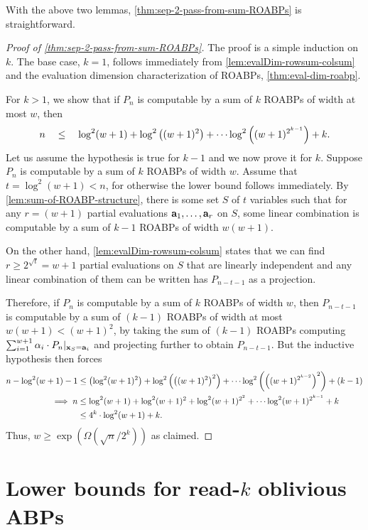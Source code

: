 \documentclass[11pt]{article}
\begin{document}
With the above two lemmas, \autoref{thm:sep-2-pass-from-sum-ROABPs} is straightforward. 

\begin{proof}[Proof of \autoref{thm:sep-2-pass-from-sum-ROABPs}]
  The proof is a simple induction on $k$. The base case, $k=1$, follows immediately from \autoref{lem:evalDim-rowsum-colsum} and the evaluation dimension characterization of ROABPs, \autoref{thm:eval-dim-roabp}.

  For $k>1$, we show that if $P_n$ is computable by a sum of $k$ ROABPs of width at most $w$, then
  \[
  n \quad \leq \quad \log^2(w+1) + \log^2\left( (w+1)^2 \right) + \cdots \log^2 \left( (w+1)^{2^{k-1}} \right) + k. 
  \]
  Let us assume the hypothesis is true for $k-1$ and we now prove it for $k$. Suppose $P_n$ is computable by a sum of $k$ ROABPs of width $w$. Assume that $t = \log^2(w+1) < n$, for otherwise the lower bound follows immediately. By \autoref{lem:sum-of-ROABP-structure}, there is some set $S$ of $t$ variables such that for any $r = (w+1)$ partial evaluations $\mathbf{a}_1,\ldots, \mathbf{a}_r$ on $S$, some linear combination is computable by a sum of $k-1$ ROABPs of width $w(w+1)$.

On the other hand, \autoref{lem:evalDim-rowsum-colsum} states that we can find $r\geq 2^{\sqrt{t}} =w+1$ partial evaluations on $S$ that are linearly independent and any linear combination of them can be written has $P_{n-t-1}$ as a projection.

Therefore, if $P_n$ is computable by a sum of $k$ ROABPs of width $w$, then $P_{n-t-1}$ is computable by a sum of $(k-1)$ ROABPs of width at most $w(w+1) < (w+1)^2$, by taking the sum of $(k-1)$ ROABPs computing $\sum_{i=1}^{w+1} \alpha_i \cdot P_n |_{\mathbf{x}_S = \mathbf{a}_i}$ and projecting further to obtain $P_{n-t-1}$.  But the inductive hypothesis then forces
\begin{align*}
n - \log^2(w+1) - 1 & \leq \left( \log^2(w+1)^2 \right) + \log^2\left( \left( (w+1)^{2} \right)^2 \right) + \cdots \log^2 \left( {\left( (w+1)^{2^{k-2}} \right)}^2 \right) + (k-1)\\
\implies n  & \leq  \log^2(w+1) + \log^2(w+1)^2 + \log^2(w+1)^{2^2} + \cdots \log^2 (w+1)^{2^{k-1}} + k\\
 & \leq  4^k \cdot \log^2 (w+1) + k.
\end{align*}
Thus, $w \geq \exp(\Omega(\sqrt{n}/2^k))$ as claimed. 
\end{proof}



\section{Lower bounds for read-$k$ oblivious ABPs}\label{sec:read-k ABP LBs}
\end{document}
